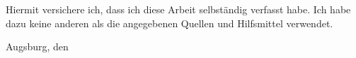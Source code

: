 \documentclass[\myrootdir/main.tex]{subfiles}
\begin{document}
\thispagestyle{empty}
\phantom{.}
\vfill

\begin{otherlanguage}{ngerman}
\setlength{\parindent}{0cm}%
Hiermit versichere ich, dass ich diese Arbeit selbständig verfasst habe.
Ich habe dazu keine anderen als die angegebenen Quellen und Hilfsmittel verwendet.

\vspace{7em}
Augsburg, den \myHandIn \hfill \myAuthor
\vspace{3em}
\end{otherlanguage}
\end{document}
